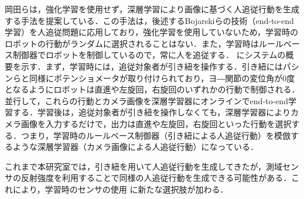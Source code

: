   \vspace{0.5cm}

  岡田ら\cite{okada}は，強化学習を使用せず，深層学習により画像に基づく人追従行動を生成する手法を提案している．この手法は，後述するBojarskiら\cite{bojarski}の技術（end-to-end学習）を人追従問題に応用しており，強化学習を使用していないため，学習時のロボットの行動がランダムに選択されることはない．また，学習時はルールベース制御器でロボットを制御しているので，常に人を追従する．
  にシステムの概要を示す．まず，学習時には，追従対象者が引き紐を操作する．引き紐にはパシンらと同様にポテンショメータが取り付けられており，ヨ―関節の変位角が0度となるようにロボットは直進や左旋回，右旋回のいずれかの行動で制御される．並行して，これらの行動とカメラ画像を深層学習器にオンラインでend-to-end学習する．学習後は，追従対象者が引き紐を操作しなくても，深層学習器によりカメラ画像を入力するだけで，出力は直進や左旋回，右旋回といった行動を選択する．つまり，学習時のルールベース制御器（引き紐による人追従行動）を模倣するような深層学習器（カメラ画像による人追従行動）になっている．

  これまで本研究室では，引き紐を用いて人追従行動を生成してきたが，測域センサの反射強度を利用することで同様の人追従行動を生成できる可能性がある．これにより，学習時のセンサの使用
  に新たな選択肢が加わる．

\newpage

\vspace{2cm}

